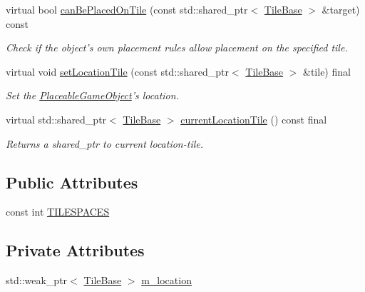 \begin{DoxyCompactItemize}
virtual bool \hyperlink{classCourse_1_1PlaceableGameObject_a09616c1b271c35df61c88b37d0b85968}{can\-Be\-Placed\-On\-Tile} (const std\-::shared\-\_\-ptr$<$ \hyperlink{classCourse_1_1TileBase}{Tile\-Base} $>$ \&target) const 
\begin{DoxyCompactList}\small\item\em Check if the object's own placement rules allow placement on the specified tile. \end{DoxyCompactList}\item 
virtual void \hyperlink{classCourse_1_1PlaceableGameObject_a22dcc18962f81c27ac0a176b37533ff4}{set\-Location\-Tile} (const std\-::shared\-\_\-ptr$<$ \hyperlink{classCourse_1_1TileBase}{Tile\-Base} $>$ \&tile) final
\begin{DoxyCompactList}\small\item\em Set the \hyperlink{classCourse_1_1PlaceableGameObject}{Placeable\-Game\-Object}'s location. \end{DoxyCompactList}\item 
virtual std\-::shared\-\_\-ptr$<$ \hyperlink{classCourse_1_1TileBase}{Tile\-Base} $>$ \hyperlink{classCourse_1_1PlaceableGameObject_a860e49fae06b1f58641d9ff373d46fdf}{current\-Location\-Tile} () const final
\begin{DoxyCompactList}\small\item\em Returns a shared\-\_\-ptr to current location-\/tile. \end{DoxyCompactList}\end{DoxyCompactItemize}
\subsection*{Public Attributes}
\begin{DoxyCompactItemize}
\item 
const int \hyperlink{classCourse_1_1PlaceableGameObject_a9f3a7d817d3f90754025fb7a46d7f70d}{T\-I\-L\-E\-S\-P\-A\-C\-E\-S}
\end{DoxyCompactItemize}
\subsection*{Private Attributes}
\begin{DoxyCompactItemize}
\item 
std\-::weak\-\_\-ptr$<$ \hyperlink{classCourse_1_1TileBase}{Tile\-Base} $>$ \hyperlink{classCourse_1_1PlaceableGameObject_a2c59e31d488edddd6cb41e5b39a01456}{m\-\_\-location}
\end{DoxyCompactItemize}
